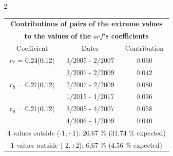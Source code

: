 
\thispagestyle{empty}
\begin{multicols}{2}{ 
\begin{tabular}{ccc}
\multicolumn{3}{c}{\textbf{Contributions of pairs of the extreme values} }  \vspace{-.10in}  \\ 
\multicolumn{3}{c}{ \textbf{to the values of the $acf$'s coefficients}} \\ 
\hline 
\hline                  Coefficient  &  Dates &  Contribution \\ 
\hline 
  $r_{ 7}$ = 0.24(0.12) &       3/2005 -  2/2007 &        0.060   \vspace{-.10in} \\  
&        3/2007 -  2/2009 &        0.042  \vspace{-.02in} \\ \hline 
  $r_{ 8}$ = 0.27(0.12) &       2/2007 -  2/2009 &        0.080   \vspace{-.10in} \\  
&        1/2015 -  1/2017 &        0.036  \vspace{-.02in} \\ \hline 
  $r_{ 9}$ = 0.21(0.12) &       3/2005 -  4/2007 &        0.058   \vspace{-.10in} \\  
&        4/2006 -  1/2009 &        0.040  \vspace{-.02in} \\ \hline 
\multicolumn{3}{c}{               4 values outside (-1,+1): 26.67  \% (31.74  \% expected)}\vspace{-.10in} \\ 
\multicolumn{3}{c}{               1 values outside (-2,+2):  6.67 \%  (4.56 \% expected) } \\
 \end{tabular} \\ 
 } 
\end{multicols} 

